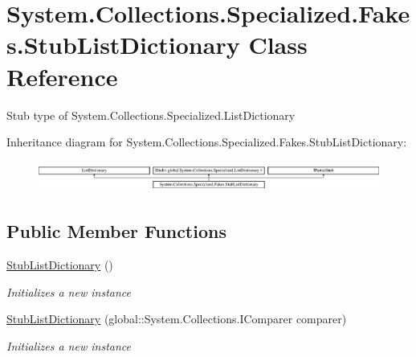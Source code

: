 \hypertarget{class_system_1_1_collections_1_1_specialized_1_1_fakes_1_1_stub_list_dictionary}{\section{System.\-Collections.\-Specialized.\-Fakes.\-Stub\-List\-Dictionary Class Reference}
\label{class_system_1_1_collections_1_1_specialized_1_1_fakes_1_1_stub_list_dictionary}
}


Stub type of System.\-Collections.\-Specialized.\-List\-Dictionary 


Inheritance diagram for System.\-Collections.\-Specialized.\-Fakes.\-Stub\-List\-Dictionary\-:\begin{figure}[H]
\begin{center}
\leavevmode
\includegraphics[height=1.020036cm]{class_system_1_1_collections_1_1_specialized_1_1_fakes_1_1_stub_list_dictionary}
\end{center}
\end{figure}
\subsection*{Public Member Functions}
\begin{DoxyCompactItemize}
\item 
\hyperlink{class_system_1_1_collections_1_1_specialized_1_1_fakes_1_1_stub_list_dictionary_a58bc3ee3618f6c9652b218c257d5e6f8}{Stub\-List\-Dictionary} ()
\begin{DoxyCompactList}\small\item\em Initializes a new instance\end{DoxyCompactList}\item 
\hyperlink{class_system_1_1_collections_1_1_specialized_1_1_fakes_1_1_stub_list_dictionary_adcc4f8d667b76c5b3f5ad455f11cfa85}{Stub\-List\-Dictionary} (global\-::\-System.\-Collections.\-I\-Comparer comparer)
\begin{DoxyCompactList}\small\item\em Initializes a new instance\end{DoxyCompactList}\end{DoxyCompactItemize}
